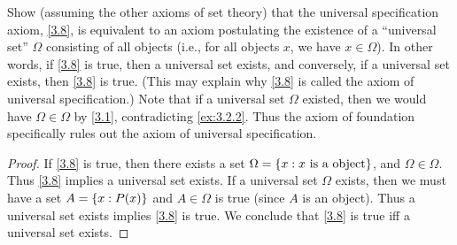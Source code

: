\begin{ex}\label{ex:3.2.3}
  Show (assuming the other axioms of set theory) that the universal specification axiom, \cref{3.8}, is equivalent to an axiom postulating the existence of a ``universal set'' \(\Omega\) consisting of all objects (i.e., for all objects \(x\), we have \(x \in \Omega\)).
  In other words, if \cref{3.8} is true, then a universal set exists, and conversely, if a universal set exists, then \cref{3.8} is true.
  (This may explain why \cref{3.8} is called the axiom of universal specification.)
  Note that if a universal set \(\Omega\) existed, then we would have \(\Omega \in \Omega\) by \cref{3.1}, contradicting \cref{ex:3.2.2}.
  Thus the axiom of foundation specifically rules out the axiom of universal specification.
\end{ex}

\begin{proof}
  If \cref{3.8} is true, then there exists a set \(\Omega = \left\lbrace x: x \text{ is a object}\right\rbrace\), and \(\Omega \in \Omega\).
  Thus \cref{3.8} implies a universal set exists.
  If a universal set \(\Omega\) exists, then we must have a set \(A = \left\lbrace x: P(x)\right\rbrace\) and \(A \in \Omega\) is true (since \(A\) is an object).
  Thus a universal set exists implies \cref{3.8} is true.
  We conclude that \cref{3.8} is true iff a universal set exists.
\end{proof}